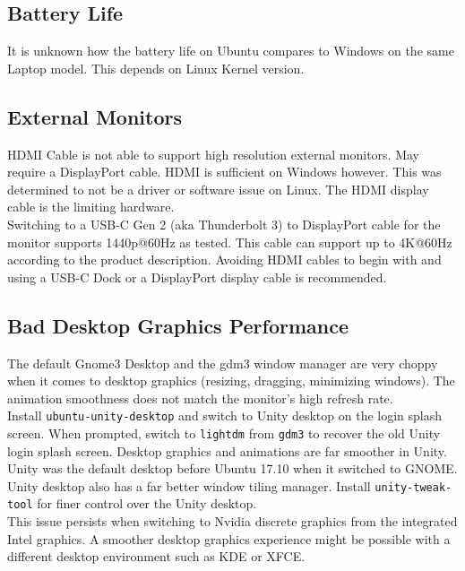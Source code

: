 \documentclass[10pt,letterpaper,twocolumn]{article}
\begin{document}
\subsection{Battery Life}

It is unknown how the battery life on Ubuntu compares to Windows on the same Laptop model. This depends on Linux Kernel version.

\subsection{External Monitors}

HDMI Cable is not able to support high resolution external monitors. May require a DisplayPort cable. HDMI is sufficient on Windows however. This was determined to not be a driver or software issue on Linux. The HDMI display cable is the limiting hardware.\\

Switching to a USB-C Gen 2 (aka Thunderbolt 3) to DisplayPort cable for the monitor supports 1440p@60Hz as tested. This cable can support up to 4K@60Hz according to the product description. Avoiding HDMI cables to begin with and using a USB-C Dock or a DisplayPort display cable is recommended.

\subsection{Bad Desktop Graphics Performance}

The default Gnome3 Desktop and the gdm3 window manager are very choppy when it comes to desktop graphics (resizing, dragging, minimizing windows). The animation smoothness does not match the monitor's high refresh rate. \\

Install \texttt{ubuntu-unity-desktop} and switch to Unity desktop on the login splash screen. When prompted, switch to \texttt{lightdm} from \texttt{gdm3} to recover the old Unity login splash screen. Desktop graphics and animations are far smoother in Unity. Unity was the default desktop before Ubuntu 17.10 when it switched to GNOME. Unity desktop also has a far better window tiling manager. Install \texttt{unity-tweak-tool} for finer control over the Unity desktop.\\

This issue persists when switching to Nvidia discrete graphics from the integrated Intel graphics. A smoother desktop graphics experience might be possible with a different desktop environment such as KDE or XFCE.
\end{document}
